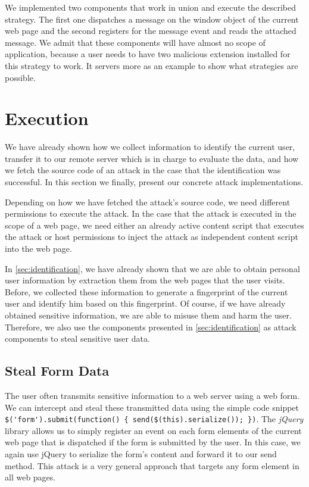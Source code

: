 	We implemented two components that work in union and execute the described strategy. The first one dispatches a message on the window object of the current web page and the second registers for the message event and reads the attached message. We admit that these components will have almost no scope of application, because a user needs to have two malicious extension installed for this strategy to work. It servers more as an example to show what strategies are possible.


\clearpage
\section{Execution}
\label{sec:execution}
	
	We have already shown how we collect information to identify the current user, transfer it to our remote server which is in charge to evaluate the data, and how we fetch the source code of an attack in the case that the identification was successful. In this section we finally, present our concrete attack implementations.
	
	Depending on how we have fetched the attack's source code, we need different permissions to execute the attack. In the case that the attack is executed in the scope of a web page, we need either an already active content script that executes the attack or host permissions to inject the attack as independent content script into the web page.

	In \autoref{sec:identification}, we have already shown that we are able to obtain personal user information by extraction them from the web pages that the user visits. Before, we collected these information to generate a fingerprint of the current user and identify him based on this fingerprint. Of course, if we have already obtained sensitive information, we are able to misuse them and harm the user. Therefore, we also use the components presented in \autoref{sec:identification} as attack components to steal sensitive user data.

\subsection{Steal Form Data}
\label{sec:stealFormData}

	The user often transmits sensitive information to a web server using a web form. We can intercept and steal these transmitted data using the simple code snippet \lstinline|$('form').submit(function() { send($(this).serialize()); })|. The \textit{jQuery} library allows us to simply register an event on each form elements of the current web page that is dispatched if the form is submitted by the user. In this case, we again use jQuery to serialize the form's content and forward it to our send method. This attack is a very general approach that targets any form element in all web pages.
	
